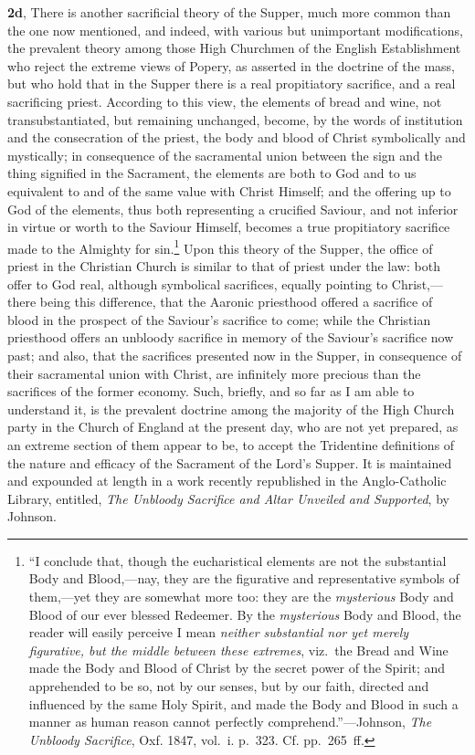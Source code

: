 \documentclass[
  english,
]{book}
\begin{document}
\textbf{2d}, There is another sacrificial theory of the Supper, much more common than the one now mentioned, and indeed, with various but unimportant modifications, the prevalent theory among those High Churchmen of the English Establishment who reject the extreme views of Popery, as asserted in the doctrine of the mass, but who hold that in the Supper there is a real propitiatory sacrifice, and a real sacrificing priest. According to this view, the elements of bread and wine, not transubstantiated, but remaining unchanged, become, by the words of institution and the consecration of the priest, the body and blood of Christ symbolically and mystically; in consequence of the sacramental union between the sign and the thing signified in the Sacrament, the elements are both to God and to us equivalent to and of the same value with Christ Himself; and the offering up to God of the elements, thus both representing a crucified Saviour, and not inferior in virtue or worth to the Saviour Himself, becomes a true propitiatory sacrifice made to the Almighty for sin.\footnote{``I conclude that, though the eucharistical elements are not the substantial Body and Blood,---nay, they are the figurative and representative symbols of them,---yet they are somewhat more too: they are the \emph{mysterious} Body and Blood of our ever blessed Redeemer. By the \emph{mysterious} Body and Blood, the reader will easily perceive I mean \emph{neither substantial nor yet merely figurative, but the middle between these extremes}, viz.~the Bread and Wine made the Body and Blood of Christ by the secret power of the Spirit; and apprehended to be so, not by our senses, but by our faith, directed and influenced by the same Holy Spirit, and made the Body and Blood in such a manner as human reason cannot perfectly comprehend.''---Johnson, \emph{The Unbloody Sacrifice}, Oxf. 1847, vol.~i. p.~323. Cf. pp.~265~ff.} Upon this theory of the Supper, the office of priest in the Christian Church is similar to that of priest under the law: both offer to God real, although symbolical sacrifices, equally pointing to Christ,---there being this difference, that the Aaronic priesthood offered a sacrifice of blood in the prospect of the Saviour's sacrifice to come; while the Christian priesthood offers an unbloody sacrifice in memory of the Saviour's sacrifice now past; and also, that the sacrifices presented now in the Supper, in consequence of their sacramental union with Christ, are infinitely more precious than the sacrifices of the former economy. Such, briefly, and so far as I am able to understand it, is the prevalent doctrine among the majority of the High Church party in the Church of England at the present day, who are not yet prepared, as an extreme section of them appear to be, to accept the Tridentine definitions of the nature and efficacy of the Sacrament of the Lord's Supper. It is maintained and expounded at length in a work recently republished in the Anglo-Catholic Library, entitled, \emph{The Unbloody Sacrifice and Altar Unveiled and Supported}, by Johnson.
\end{document}
